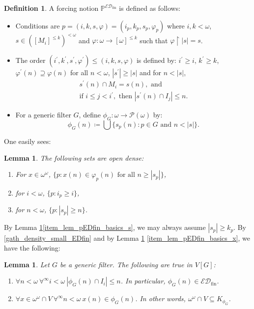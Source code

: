 \documentclass[a4paper,12pt]{amsart}
\newtheorem{lem}[thm]{Lemma}
\theoremstyle{definition}
\newtheorem{dfn}[thm]{Definition}
\numberwithin{thm}{section}
\numberwithin{equation}{section}
\newcommand{\oo}{{\omega}^\omega}
\newcommand{\on}{\mathpunct{\upharpoonright}}
\newcommand{\edfin}{\mathcal{ED}_\mathrm{fin}}
\renewcommand{\subset}{\subseteq}
\newcommand{\posetEDfin}{\mathbb{P}^{\edfin}}
\begin{document}
    \begin{dfn} 	
		A forcing notion $\posetEDfin$ is defined as follows:
		\begin{itemize}
			\item Conditions are $p=(i,k,s,\varphi)=(i_p,k_p,s_p,\varphi_p)$ where $i,k<\omega$, $s\in([M_i]^{\leq k})^{<\omega}$ and $\varphi\colon \omega\to [\omega]^{\leq k}$ such that $\varphi\on |s|=s$.
			\item The order $(i^\prime,k^\prime,s^\prime,\varphi^\prime)\leq(i,k,s,\varphi)$ is defined by: $i^\prime\geq i$, $k^\prime\geq k$, $\varphi^\prime(n)\supseteq\varphi(n)$ for all $n<\omega$, $|s^\prime|\geq|s|$ and for $n<|s|$,
			\begin{gather}
				\label{gath_end_ext_EDfin} s^\prime(n)\cap M_i=s(n),\text{ and}\\ 
				\label{gath_density_small_EDfin} \text{if }i\leq j< i^\prime,\text{ then } |s^\prime(n)\cap I_j|\leq n.
			\end{gather}
			\item For a generic filter $G$, define $\phi_G\colon\omega\to\mathcal{P}(\omega)$ by:
			\[\phi_G(n)\coloneq\bigcup \{s_p(n):p\in G\text{ and }n<|s|\}.\]
		\end{itemize}
	\end{dfn}
	
	One easily sees:
    
	\begin{lem}
		\label{lem:pEDfin_basics}
		The following sets are open dense:
		\begin{enumerate}
			\item\label{item_lem_pEDfin_basics_x} For $x\in\oo$, $\{p:x(n)\in\varphi_p(n)\text{ for all }n\geq |s_p|\}$, 
			\item for $i<\omega$, $\{p:i_p\geq i\}$, 
			\item\label{item_lem_pEDfin_basics_s} for $n<\omega$, $\{p:|s_p|\geq n\}$. 
		\end{enumerate}
	\end{lem}
    
	By Lemma \ref{lem:pEDfin_basics}\eqref{item_lem_pEDfin_basics_s}, we may always assume $|s_p|\geq k_p$.
	By \eqref{gath_density_small_EDfin} and by Lemma \ref{lem:pEDfin_basics} \eqref{item_lem_pEDfin_basics_x}, we have the following:
	
    \begin{lem}
		Let $G$ be a generic filter. The following are true in $V[G]$:
		\begin{enumerate}
			\item $\forall n<\omega~\forall^\infty i<\omega~|\phi_G(n)\cap I_i|\leq n$. In particular, $\phi_G(n)\in\edfin$.
			\item $\forall x\in\oo\cap V~\forall^\infty n<\omega~x(n)\in \phi_G(n)$. In other words, $\oo\cap V\subset K_{\phi_G}$.
		\end{enumerate}
	\end{lem}
	
\end{document}
